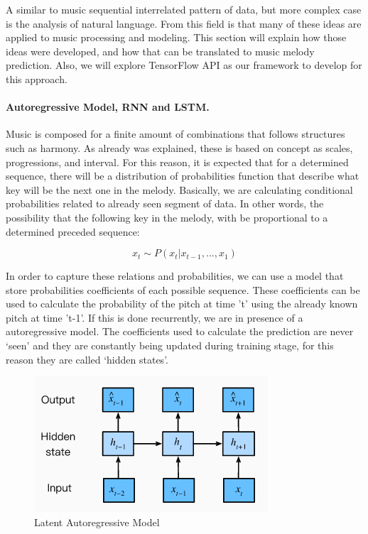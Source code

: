 A similar to music sequential interrelated pattern of data, but more complex case is the
analysis of natural language. From this field is that many of these ideas are applied to
music processing and modeling. This section will explain how those ideas were
developed, and how that can be translated to music melody prediction. Also, we will
explore TensorFlow API as our framework to develop for this approach.

\paragraph{Autoregressive Model, RNN and LSTM.} Music is composed for a finite amount of
combinations that follows structures such as harmony. As already was explained, these is
based on concept as scales, progressions, and interval. For this reason, it is expected
that for a determined sequence, there will be a distribution of probabilities function
that describe what key will be the next one in the melody. Basically, we are calculating
conditional probabilities related to already seen segment of data. In other words, the
possibility that the following key in the melody, with be proportional to a determined
preceded sequence:

\begin{equation}
  x_t \sim P \left( x_t \vert  x_{t - 1}, ..., x_1 \right)
\end{equation}

In order to capture these relations and probabilities, we can use a model that store
probabilities coefficients of each possible sequence. These coefficients can be used to
calculate the probability of the pitch at time ’t’ using the already known pitch at time
’t-1’. If this is done recurrently, we are in presence of a autoregressive model. The
coefficients used to calculate the prediction are never ‘seen’ and they are constantly
being updated during training stage, for this reason they are called ‘hidden states’.

\begin{figure}[h!]
  \includegraphics[width=\linewidth]{image/fig_JDF12.png}
  \caption{Latent Autoregressive Model}
\end{figure}


